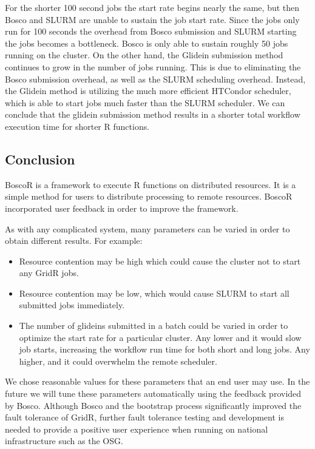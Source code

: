 For the shorter 100 second jobs the start rate begins nearly the same, but then Bosco and SLURM are unable to sustain the job start rate.  Since the jobs only run for 100 seconds the overhead from Bosco submission and SLURM starting the jobs becomes a bottleneck.  Bosco is only able to sustain roughly 50 jobs running on the cluster.  On the other hand, the Glidein submission method continues to grow in the number of jobs running.  This is due to eliminating the Bosco submission overhead, as well as the SLURM scheduling overhead.  Instead, the Glidein method is utilizing the much more efficient HTCondor scheduler, which is able to start jobs much faster than the SLURM scheduler.  We can conclude that the glidein submission method results in a shorter total workflow execution time for shorter R functions.


\subsection{Conclusion}

BoscoR is a framework to execute R functions on distributed resources.  It is a simple method for users to distribute processing to remote resources.  BoscoR incorporated user feedback in order to improve the framework.

As with any complicated system, many parameters can be varied in order to obtain different results.  For example:
\begin{itemize}
\item Resource contention may be high which could cause the cluster not to start any GridR jobs.
\item Resource contention may be low, which would cause SLURM to start all submitted jobs immediately.
\item The number of glideins submitted in a batch could be varied in order to optimize the start rate for a particular cluster.  Any lower and it would slow job starts, increasing the workflow run time for both short and long jobs.  Any higher, and it could overwhelm the remote scheduler.
\end{itemize}

We chose reasonable values for these parameters that an end user may use.  In the future we will tune these parameters automatically using the feedback provided by Bosco.  Although Bosco and the bootstrap process significantly improved the fault tolerance of GridR, further fault tolerance testing and development is needed to provide a positive user experience when running on national infrastructure such as the OSG.

